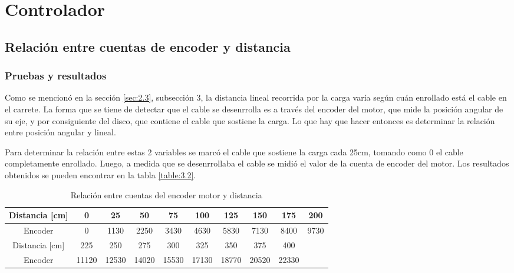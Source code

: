 

\section{Controlador} \label{sec:\thesection}

\subsection{Relación entre cuentas de encoder y distancia}
\subsubsection{Pruebas y resultados}
Como se mencionó en la sección \ref{sec:2.3}, subsección 3, la distancia lineal recorrida por la carga varía según cuán enrollado está el cable en el carrete. La forma que se tiene de detectar que el cable se desenrrolla es a través del encoder del motor, que mide la posición angular de su eje, y por consiguiente del disco, que contiene el cable que sostiene la carga. Lo que hay que hacer entonces es determinar la relación entre posición angular y lineal.

Para determinar la relación entre estas 2 variables se marcó el cable que sostiene la carga cada 25cm, tomando como 0 el cable completamente enrollado. Luego, a medida que se desenrrollaba el cable se midió el valor de la cuenta de encoder del motor. Los resultados obtenidos se pueden encontrar en la tabla \ref{table:3.2}.

\begin{table}[!ht]
	\begin{center}
		
		\begin{tabular}{|c|c|c|c|c|c|c|c|c|c|}
			\hline
			\rowcolor{OODlightblue}
			Distancia [cm] & 0 & 25 & 50 & 75 & 100 & 125 & 150 & 175 & 200  \\
			\hline
			Encoder & 0 & 1130 & 2250 & 3430 & 4630 & 5830 & 7130 & 8400 & 9730 \\
			\hline \hline
			\rowcolor{OODlightblue}
			Distancia [cm]  & 225 & 250 & 275 & 300 & 325 & 350 & 375 & 400 & \\
			\hline
			Encoder  & 11120 & 12530 & 14020 & 15530 & 17130 & 18770 & 20520 & 22330 & \\ 
			\hline
		\end{tabular}
	\end{center}
	\caption{Relación entre cuentas del encoder motor y distancia}
	\label{table:\thetable}
\end{table}

